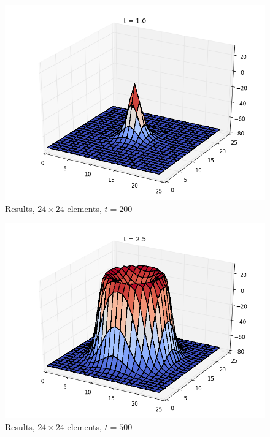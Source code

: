 \begin{figure}[ht]
  \centering 
  \includegraphics[width=0.9\columnwidth]{examples/example-0401/doc/figures/current_run_l1x1_n24x24_i1_s0_p1__t200.png} 
  \caption{Results, $24 \times 24$ elements, $t=200$}
  \label{example-0401-current-run2-fig}
\end{figure}

\begin{figure}[ht]
  \centering 
  \includegraphics[width=0.9\columnwidth]{examples/example-0401/doc/figures/current_run_l1x1_n24x24_i1_s0_p1__t500.png} 
  \caption{Results, $24 \times 24$ elements, $t=500$}
  \label{example-0401-current-run3-fig}
\end{figure}

